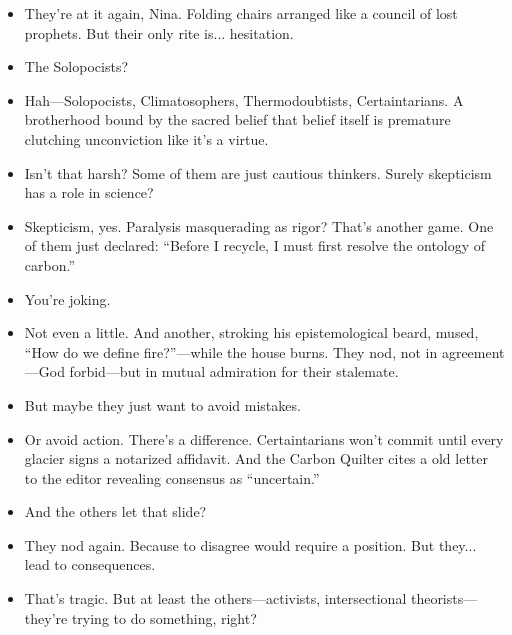 \begin{itemize}[leftmargin=1.3cm]

\item[Eleanor:] They’re at it again, Nina. Folding chairs arranged like a council of lost prophets. But their only rite is... hesitation.

\item[Nina:] The Solopocists?

\item[Eleanor:] Hah—Solopocists, Climatosophers, Thermodoubtists, Certaintarians. A brotherhood bound by the sacred belief that belief itself is premature clutching unconviction like it’s a virtue.

\item[Nina:] Isn’t that harsh? Some of them are just cautious thinkers. Surely skepticism has a role in science?

\item[Eleanor:] Skepticism, yes. Paralysis masquerading as rigor? That’s another game. One of them just declared: “Before I recycle, I must first resolve the ontology of carbon.”

\item[Nina:] You’re joking.

\item[Eleanor:] Not even a little. And another, stroking his epistemological beard, mused, “How do we define fire?”—while the house burns. They nod, not in agreement—God forbid—but in mutual admiration for their stalemate.

\item[Nina:] But maybe they just want to avoid mistakes.

\item[Eleanor:] Or avoid action. There’s a difference. Certaintarians won’t commit until every glacier signs a notarized affidavit. And the Carbon Quilter cites a old letter to the editor revealing consensus as “uncertain.”

\item[Nina:] And the others let that slide?

\item[Eleanor:] They nod again. Because to disagree would require a position. But they... lead to consequences. 

\item[Nina:] That’s tragic. But at least the others—activists, intersectional theorists—they’re trying to do something, right?


\end{itemize}
